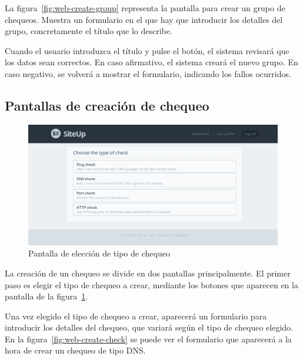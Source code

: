 La figura~\ref{fig:web-create-group} representa la pantalla para crear un grupo
de chequeos. Muestra un formulario en el que hay que introducir los detalles del
grupo, concretamente el título que lo describe.

Cuando el usuario introduzca el título y pulse el botón, el sistema revisará que
los datos sean correctos. En caso afirmativo, el sistema creará el nuevo
grupo. En caso negativo, se volverá a mostrar el formulario, indicando los
fallos ocurridos.


\subsection{Pantallas de creación de chequeo}

\begin{figure}[htbp]
  \centering
  \includegraphics[width=\textwidth]{5_diseno/web-choose-type}
  \caption{Pantalla de elección de tipo de chequeo}
  \label{fig:web-choose-type}
\end{figure}

La creación de un chequeo se divide en dos pantallas principalmente. El primer
paso es elegir el tipo de chequeo a crear, mediante los botones que aparecen en
la pantalla de la figura~\ref{fig:web-choose-type}. 

Una vez elegido el tipo de chequeo a crear, aparecerá un formulario para
introducir los detalles del chequeo, que variará según el tipo de chequeo
elegido. En la figura~\ref{fig:web-create-check} se puede ver el formulario que
aparecerá a la hora de crear un chequeo de tipo DNS.

